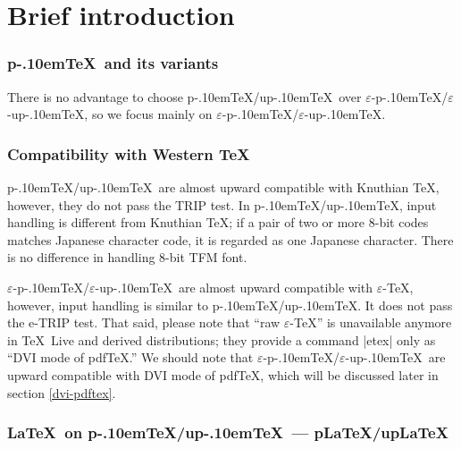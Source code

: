 \documentclass[a4paper,11pt]{article}
\let\emph=\origemph
\def\epTeX{$\varepsilon$-\pTeX}\def\eTeX{$\varepsilon$-\TeX}
\def\eupTeX{$\varepsilon$-\upTeX}\def\upTeX{u\pTeX}
\def\pTeX{p\kern-.10em\TeX}
\def\pLaTeX{p\LaTeX}\def\upLaTeX{u\pLaTeX}
\def\pdfTeX{pdf\TeX}
\begin{document}
\tableofcontents


\newpage


\part{Brief introduction}%

\section{\pTeX\ and its variants}


There is no advantage to choose \pTeX/\upTeX\ over \epTeX/\eupTeX,
so we focus mainly on \epTeX/\eupTeX.


\section{Compatibility with Western \TeX}

\pTeX/\upTeX\ are almost upward compatible with Knuthian \TeX,
however, they do not pass the TRIP test.
In \pTeX/\upTeX, input handling is different from Knuthian \TeX;
if a pair of two or more 8-bit codes matches Japanese character code,
it is regarded as one Japanese character.
There is no difference in handling 8-bit TFM font.

\epTeX/\eupTeX\ are almost upward compatible with \eTeX,
however, input handling is similar to \pTeX/\upTeX.
It does not pass the e-TRIP test.
That said, please note that ``raw \eTeX'' is unavailable anymore
in \TeX\ Live and derived distributions;
they provide a command |etex| only as ``DVI mode of \pdfTeX.''
We should note that
\epTeX/\eupTeX\ are \emph{not} upward compatible with DVI mode of \pdfTeX,
which will be discussed later in section \ref{dvi-pdftex}.

\section{\LaTeX\ on \pTeX/\upTeX\ --- \pLaTeX/\upLaTeX}
\end{document}
